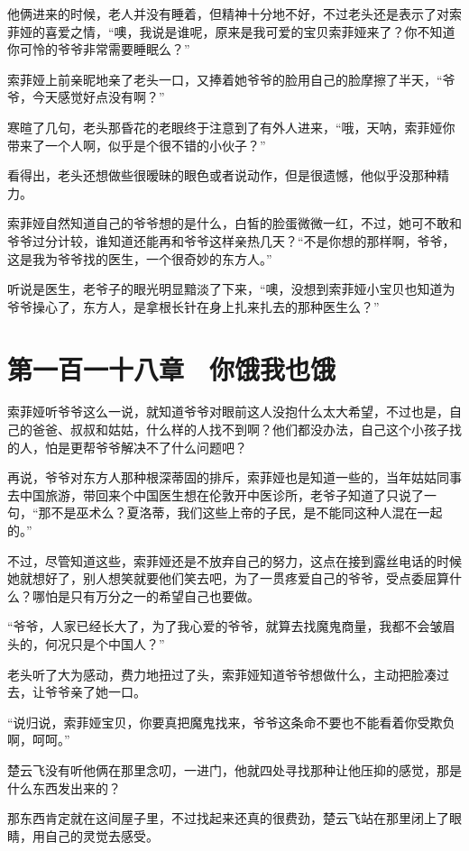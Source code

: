 他俩进来的时候，老人并没有睡着，但精神十分地不好，不过老头还是表示了对索菲娅的喜爱之情，“噢，我说是谁呢，原来是我可爱的宝贝索菲娅来了？你不知道你可怜的爷爷非常需要睡眠么？”

索菲娅上前亲昵地亲了老头一口，又捧着她爷爷的脸用自己的脸摩擦了半天，“爷爷，今天感觉好点没有啊？”

寒暄了几句，老头那昏花的老眼终于注意到了有外人进来，“哦，天呐，索菲娅你带来了一个人啊，似乎是个很不错的小伙子？”

看得出，老头还想做些很暧昧的眼色或者说动作，但是很遗憾，他似乎没那种精力。

索菲娅自然知道自己的爷爷想的是什么，白皙的脸蛋微微一红，不过，她可不敢和爷爷过分计较，谁知道还能再和爷爷这样亲热几天？“不是你想的那样啊，爷爷，这是我为爷爷找的医生，一个很奇妙的东方人。”

听说是医生，老爷子的眼光明显黯淡了下来，“噢，没想到索菲娅小宝贝也知道为爷爷操心了，东方人，是拿根长针在身上扎来扎去的那种医生么？”

\section{第一百一十八章　你饿我也饿}

索菲娅听爷爷这么一说，就知道爷爷对眼前这人没抱什么太大希望，不过也是，自己的爸爸、叔叔和姑姑，什么样的人找不到啊？他们都没办法，自己这个小孩子找的人，怕是更帮爷爷解决不了什么问题吧？

再说，爷爷对东方人那种根深蒂固的排斥，索菲娅也是知道一些的，当年姑姑同事去中国旅游，带回来个中国医生想在伦敦开中医诊所，老爷子知道了只说了一句，“那不是巫术么？夏洛蒂，我们这些上帝的子民，是不能同这种人混在一起的。”

不过，尽管知道这些，索菲娅还是不放弃自己的努力，这点在接到露丝电话的时候她就想好了，别人想笑就要他们笑去吧，为了一贯疼爱自己的爷爷，受点委屈算什么？哪怕是只有万分之一的希望自己也要做。

“爷爷，人家已经长大了，为了我心爱的爷爷，就算去找魔鬼商量，我都不会皱眉头的，何况只是个中国人？”

老头听了大为感动，费力地扭过了头，索菲娅知道爷爷想做什么，主动把脸凑过去，让爷爷亲了她一口。

“说归说，索菲娅宝贝，你要真把魔鬼找来，爷爷这条命不要也不能看着你受欺负啊，呵呵。”

楚云飞没有听他俩在那里念叨，一进门，他就四处寻找那种让他压抑的感觉，那是什么东西发出来的？

那东西肯定就在这间屋子里，不过找起来还真的很费劲，楚云飞站在那里闭上了眼睛，用自己的灵觉去感受。

